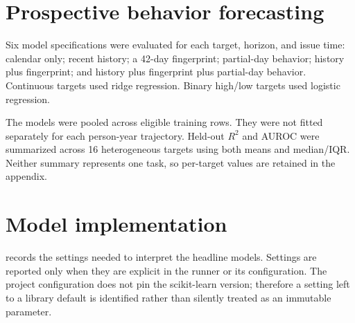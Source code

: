 \documentclass[a4paper,11pt,oneside]{report}
\begin{document}
\section{Prospective behavior forecasting}

Six model specifications were evaluated for each target, horizon, and issue time:
calendar only; recent history; a 42-day fingerprint; partial-day behavior; history
plus fingerprint; and history plus fingerprint plus partial-day behavior. Continuous
targets used ridge regression. Binary high/low targets used logistic regression.

The models were pooled across eligible training rows. They were not fitted separately
for each person-year trajectory. Held-out $R^2$ and AUROC were summarized across 16
heterogeneous targets using both means and median/IQR. Neither summary represents
one task, so per-target values are retained in the appendix.

\section{Model implementation}

 records the settings needed to interpret the headline
models. Settings are reported only when they are explicit in the runner or its
configuration. The project configuration does not pin the scikit-learn version;
therefore a setting left to a library default is identified rather than silently
treated as an immutable parameter.
\end{document}

